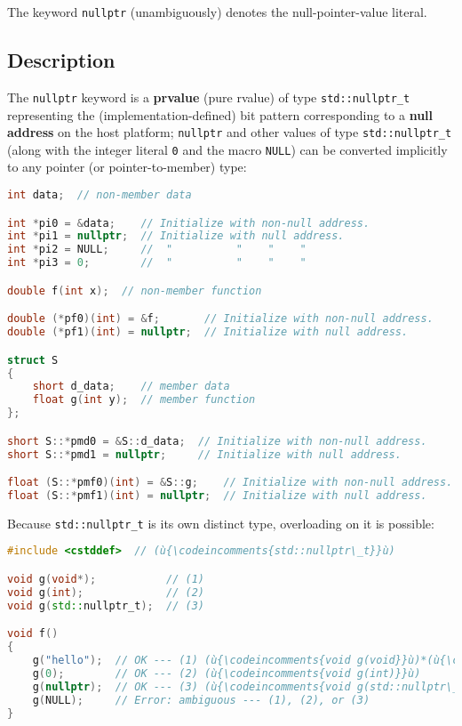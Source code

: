 

The keyword \texttt{nullptr} (unambiguously) denotes the
null-pointer-value literal.

\subsection[Description]{Description}\label{description}

The \texttt{nullptr} keyword is a \textbf{prvalue} (pure rvalue) of type
\texttt{std::nullptr\_t} representing the (implementation-defined)
bit pattern corresponding to a \textbf{null address} on the host platform;
\texttt{nullptr} and other values of type \texttt{std::nullptr\_t}
(along with the integer literal \texttt{0} and the macro \texttt{NULL})
can be converted implicitly to any pointer (or pointer-to-member) type:

\begin{lstlisting}[language=C++]
int data;  // non-member data

int *pi0 = &data;    // Initialize with non-null address.
int *pi1 = nullptr;  // Initialize with null address.
int *pi2 = NULL;     //  "          "    "    "
int *pi3 = 0;        //  "          "    "    "

double f(int x);  // non-member function

double (*pf0)(int) = &f;       // Initialize with non-null address.
double (*pf1)(int) = nullptr;  // Initialize with null address.

struct S
{
    short d_data;    // member data
    float g(int y);  // member function
};

short S::*pmd0 = &S::d_data;  // Initialize with non-null address.
short S::*pmd1 = nullptr;     // Initialize with null address.

float (S::*pmf0)(int) = &S::g;    // Initialize with non-null address.
float (S::*pmf1)(int) = nullptr;  // Initialize with null address.
\end{lstlisting}
    

\noindent Because \texttt{std::nullptr\_t} is its own distinct type, overloading on
it is possible:

\begin{lstlisting}[language=C++]
#include <cstddef>  // (ù{\codeincomments{std::nullptr\_t}}ù)

void g(void*);           // (1)
void g(int);             // (2)
void g(std::nullptr_t);  // (3)

void f()
{
    g("hello");  // OK --- (1) (ù{\codeincomments{void g(void}}ù)*(ù{\codeincomments{)}}ù)
    g(0);        // OK --- (2) (ù{\codeincomments{void g(int)}}ù)
    g(nullptr);  // OK --- (3) (ù{\codeincomments{void g(std::nullptr\_t)}}ù)
    g(NULL);     // Error: ambiguous --- (1), (2), or (3)
}
\end{lstlisting}
    

